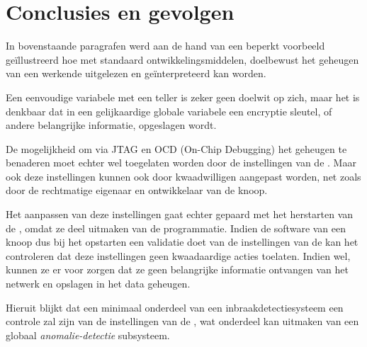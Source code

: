 \section{Conclusies en gevolgen}

In bovenstaande paragrafen werd aan de hand van een beperkt voorbeeld
ge\"illustreerd hoe met standaard ontwikkelingsmiddelen, doelbewust het
geheugen van een werkende \mcu uitgelezen en ge\"interpreteerd kan worden.

Een eenvoudige variabele met een teller is zeker geen doelwit op zich, maar het
is denkbaar dat in een gelijkaardige globale variabele een encryptie sleutel,
of andere belangrijke informatie, opgeslagen wordt.

De mogelijkheid om via JTAG en OCD (On-Chip Debugging) het geheugen te
benaderen moet echter wel toegelaten worden door de instellingen van de \mcu.
Maar ook deze instellingen kunnen ook door kwaadwilligen aangepast worden, net
zoals door de rechtmatige eigenaar en ontwikkelaar van de knoop.

Het aanpassen van deze instellingen gaat echter gepaard met het herstarten van
de \mcu, omdat ze deel uitmaken van de programmatie. Indien de software van een
knoop dus bij het opstarten een validatie doet van de instellingen van de \mcu
kan het controleren dat deze instellingen geen kwaadaardige acties toelaten.
Indien wel, kunnen ze er voor zorgen dat ze geen belangrijke informatie
ontvangen van het netwerk en opslagen in het data geheugen.

Hieruit blijkt dat een minimaal onderdeel van een inbraakdetectiesysteem een
controle zal zijn van de instellingen van de \mcu, wat onderdeel kan uitmaken
van een globaal \emph{anomalie-detectie} subsysteem.

